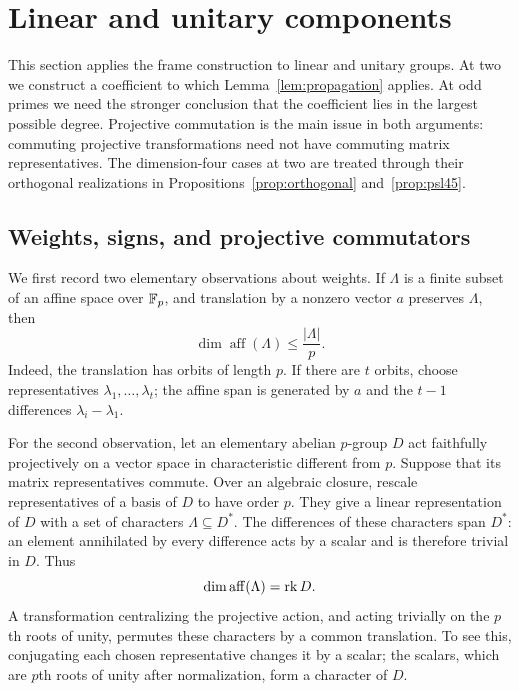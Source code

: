 \section{Linear and unitary components}\label{sec:linear}

This section applies the frame construction to linear and unitary groups.
At two we construct a coefficient to which Lemma~\ref{lem:propagation}
applies.  At odd primes we need the stronger conclusion that the coefficient
lies in the largest possible degree.  Projective commutation is the main
issue in both arguments: commuting projective transformations need not have
commuting matrix representatives.
The dimension-four cases at two are treated through their orthogonal
realizations in Propositions~\ref{prop:orthogonal} and~\ref{prop:psl45}.

\subsection{Weights, signs, and projective commutators}

We first record two elementary observations about weights.  If
$\Lambda$ is a finite subset of an affine space over $\mathbb F_p$, and translation
by a nonzero vector $a$ preserves $\Lambda$, then
\begin{equation}\label{eq:linear-translation}
 \dim\operatorname{aff}(\Lambda)\le \frac{|\Lambda|}{p}.
\end{equation}
Indeed, the translation has orbits of length $p$.  If there are $t$ orbits,
choose representatives $\lambda_1,\ldots,\lambda_t$; the affine span is
generated by $a$ and the $t-1$ differences $\lambda_i-\lambda_1$.

For the second observation, let an elementary abelian $p$-group $D$ act
faithfully projectively on a vector space in characteristic different from
$p$.  Suppose that its matrix representatives commute.  Over an algebraic
closure, rescale representatives of a basis of $D$ to have order $p$.
They give a linear representation of $D$ with a set of characters
$\Lambda\subseteq D^*$.  The differences of these characters span $D^*$:
an element annihilated by every difference acts by a scalar and is therefore
trivial in $D$.  Thus
\begin{equation}\label{eq:linear-affine-rank}
 \dim\operatorname{aff}(\Lambda)=\operatorname{rk} D.
\end{equation}
A transformation centralizing the projective action, and acting trivially
on the $p$th roots of unity, permutes these characters by a common
translation.  To see this, conjugating each chosen representative changes
it by a scalar; the scalars, which are $p$th roots of unity after
normalization, form a character of $D$.

